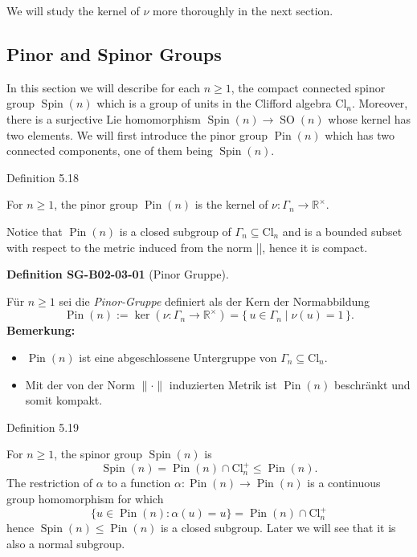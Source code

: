 \documentclass[10pt, letterpaper]{article}
\newcommand{\R}{\mathbb{R}}
\newcommand{\Cl}{\mathrm{Cl}}
\newcommand{\CustomHeading}[3]{%
  \par\medskip\noindent%
  \textbf{#1 #2} \textnormal{(#3)}.\enskip%
}
\newenvironment{DEF}[2]{\begin{unitbox}\CustomHeading{Definition}{#1}{#2}}{\end{unitbox}}
\begin{document}
We will study the kernel of $\nu$ more thoroughly in the next section.


\pagebreak

\subsection{Pinor and Spinor Groups}


In this section we will describe for each $n \geqslant 1$, the compact connected spinor group $\operatorname{Spin}(n)$ which is a group of units in the Clifford algebra $\mathrm{Cl}_{n}$. Moreover, there is a surjective Lie homomorphism $\operatorname{Spin}(n) \longrightarrow \operatorname{SO}(n)$ whose kernel has two elements. We will first introduce the pinor group $\operatorname{Pin}(n)$ which has two connected components, one of them being $\operatorname{Spin}(n)$.

Definition 5.18

For $n \geqslant 1$, the pinor group $\operatorname{Pin}(n)$ is the kernel of $\nu: \Gamma_{n} \longrightarrow \mathbb{R}^{\times}$.

Notice that $\operatorname{Pin}(n)$ is a closed subgroup of $\Gamma_{n} \subseteq \mathrm{Cl}_{n}$ and is a bounded subset with respect to the metric induced from the norm ||, hence it is compact.


\begin{DEF}{SG-B02-03-01}{Pinor Gruppe}
Für \(n \ge 1\) sei die \emph{Pinor-Gruppe} definiert als der Kern der Normabbildung
\[
\operatorname{Pin}(n) := \ker\!\left(\nu : \Gamma_n \longrightarrow \R^{\times}\right)
= \{\,u \in \Gamma_n \mid \nu(u) = 1\,\}.
\]
\textbf{Bemerkung:}
\begin{itemize}
\item \(\operatorname{Pin}(n)\) ist eine abgeschlossene Untergruppe von \(\Gamma_n \subseteq \Cl_n\).
\item Mit der von der Norm \(\|\cdot\|\) induzierten Metrik ist \(\operatorname{Pin}(n)\) beschränkt
und somit kompakt.
\end{itemize}
\end{DEF}




Definition 5.19

For $n \geqslant 1$, the spinor group $\operatorname{Spin}(n)$ is
$$
\operatorname{Spin}(n)=\operatorname{Pin}(n) \cap \mathrm{Cl}_{n}^{+} \leqslant \operatorname{Pin}(n) .
$$
The restriction of $\alpha$ to a function $\alpha: \operatorname{Pin}(n) \longrightarrow \operatorname{Pin}(n)$ is a continuous group homomorphism for which
$$
\{u \in \operatorname{Pin}(n): \alpha(u)=u\}=\operatorname{Pin}(n) \cap \mathrm{Cl}_{n}^{+}
$$
hence $\operatorname{Spin}(n) \leqslant \operatorname{Pin}(n)$ is a closed subgroup. Later we will see that it is also a normal subgroup.
\end{document}
